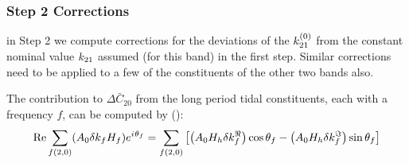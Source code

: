 \subsubsection{Step 2 Corrections}\label{sssec:step2-corr-earth-tides}
in Step 2 we compute corrections for the deviations of the 
$k ^{(0)}_{21}$ from the constant nominal value $k _{21}$ 
assumed (for this band) in the first step. Similar corrections need to be 
applied to a few of the constituents of the other two bands also.

The contribution to $\Delta \bar{C}_{20}$ from the long period tidal 
constituents, each with a frequency $f$, can be computed by (\cite{iers2010}):
\begin{equation}
  \operatorname{Re} \sum _{f(2,0)}(A_0 \delta k_f H_f) e^{{i\mkern1mu} \theta _f} = 
    \sum_{f(2,0)} \left[ \left(A_0 H_h \delta k^\Re _f \right) \cos \theta _f 
      - \left(A_0 H_h \delta k^\Im _f \right) \sin \theta _f 
    \right]
  \label{eq:iers1068a}
\end{equation}

